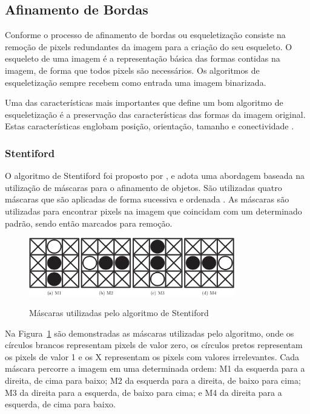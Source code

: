 \documentclass[12pt,oneside,a4paper,english,french,spanish,brazil,]{abntex2}
\begin{document}
\subsection{Afinamento de Bordas}

Conforme \citet{guilherme:2007} o processo de afinamento de bordas ou esqueletização consiste na remoção de pixels redundantes da imagem para a criação do seu esqueleto. O esqueleto de uma imagem é a representação básica das formas contidas na imagem, de forma que todos pixels são necessários. Os algoritmos de esqueletização sempre recebem como entrada uma imagem binarizada.

Uma das características mais importantes que define um bom algoritmo de esqueletização é a preservação das características das formas da imagem original. Estas características englobam posição, orientação, tamanho e conectividade \cite{guilherme:2007}.

\subsubsection{Stentiford}

O algoritmo de Stentiford foi proposto por \citet{stentiford:1983}, e adota uma abordagem baseada na utilização de máscaras para o afinamento de objetos. São utilizadas quatro máscaras que são aplicadas de forma sucessiva e ordenada \cite{guilherme:2007}. As máscaras são utilizadas para encontrar pixels na imagem que coincidam com um determinado padrão, sendo então marcados para remoção.

\begin{figure}[ht]
\centering
\caption{Máscaras utilizadas pelo algoritmo de Stentiford}
\includegraphics[width=0.8\textwidth]{imagens/PDI_Stentiford_1.PNG}
\label{fig:PDI_Stentiford_1}
\end{figure}

Na Figura~\ref{fig:PDI_Stentiford_1} são demonstradas as máscaras utilizadas pelo algoritmo, onde os círculos brancos representam pixels de valor zero, os círculos pretos representam os pixels de valor 1 e os X representam os pixels com valores irrelevantes. Cada máscara percorre a imagem em uma determinada ordem: M1 da esquerda para a direita, de cima para baixo; M2 da esquerda para a direita, de baixo para cima; M3 da direita para a esquerda, de baixo para cima; e M4 da direita para a esquerda, de cima para baixo.
\end{document}
